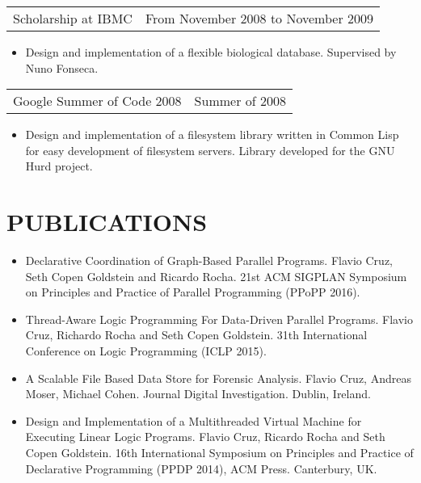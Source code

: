 \documentclass[margin]{res}
\begin{document}
\begin{resume}
		 \begin{tabular}{p{3in} r}
                  Scholarship at IBMC &  From November 2008 to November 2009 
                 \end{tabular}
		  \begin{itemize}
                   \item[] Design and implementation of a flexible biological database. Supervised by Nuno Fonseca.
                  \end{itemize}
                  

                  \begin{tabular}{p{3in} r}
                  Google Summer of Code 2008 & Summer of 2008
                  \end{tabular}	
                   \begin{itemize} %
                    \item[]  Design and implementation of a filesystem library written in Common Lisp for easy development of filesystem servers. Library developed for the GNU Hurd project. 
		   \end{itemize} 
		   
\section{PUBLICATIONS}
   \begin{itemize}

      \item Declarative Coordination of Graph-Based Parallel Programs. Flavio
            Cruz, Seth Copen Goldstein and Ricardo Rocha.  21st ACM SIGPLAN
            Symposium on Principles and Practice of Parallel Programming (PPoPP
            2016).

      \item Thread-Aware Logic Programming For Data-Driven Parallel Programs.
            Flavio Cruz, Richardo Rocha and Seth Copen Goldstein. 31th
            International Conference on Logic Programming (ICLP 2015).

      \item A Scalable File Based Data Store for Forensic Analysis. Flavio Cruz,
         Andreas Moser, Michael Cohen. Journal Digital Investigation. Dublin,
         Ireland.

      \item Design and Implementation of a Multithreaded Virtual Machine for
         Executing Linear Logic Programs. Flavio Cruz, Ricardo Rocha and Seth
         Copen Goldstein. 16th International Symposium on Principles and
         Practice of Declarative Programming (PPDP 2014), ACM Press. Canterbury,
         UK.


\end{itemize}
\end{resume}
\end{document}
